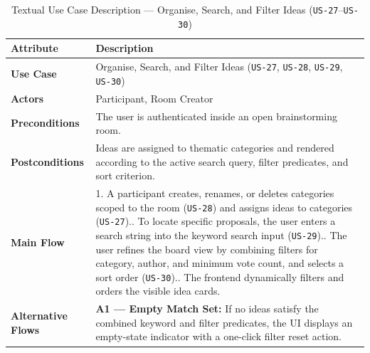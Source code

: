 \begin{table}[htbp]
\centering
\caption{Textual Use Case Description — Organise, Search, and Filter Ideas (\texttt{US-27}--\texttt{US-30})}
\label{tab:uc-organise}
\small
\begin{tabularx}{\textwidth}{@{} l X @{}}
\toprule
\textbf{Attribute} & \textbf{Description} \\
\midrule
\textbf{Use Case} & Organise, Search, and Filter Ideas (\texttt{US-27}, \texttt{US-28}, \texttt{US-29}, \texttt{US-30}) \\
\textbf{Actors} & Participant, Room Creator \\
\textbf{Preconditions} & The user is authenticated inside an open brainstorming room. \\
\textbf{Postconditions} & Ideas are assigned to thematic categories and rendered according to the active search query, filter predicates, and sort criterion. \\
\textbf{Main Flow} &
1. A participant creates, renames, or deletes categories scoped to the room (\texttt{US-28}) and assigns ideas to categories (\texttt{US-27}).\newline
2. To locate specific proposals, the user enters a search string into the keyword search input (\texttt{US-29}).\newline
3. The user refines the board view by combining filters for category, author, and minimum vote count, and selects a sort order (\texttt{US-30}).\newline
4. The frontend dynamically filters and orders the visible idea cards. \\
\textbf{Alternative Flows} &
\textbf{A1 — Empty Match Set:} If no ideas satisfy the combined keyword and filter predicates, the UI displays an empty-state indicator with a one-click filter reset action. \\
\bottomrule
\end{tabularx}
\end{table}

